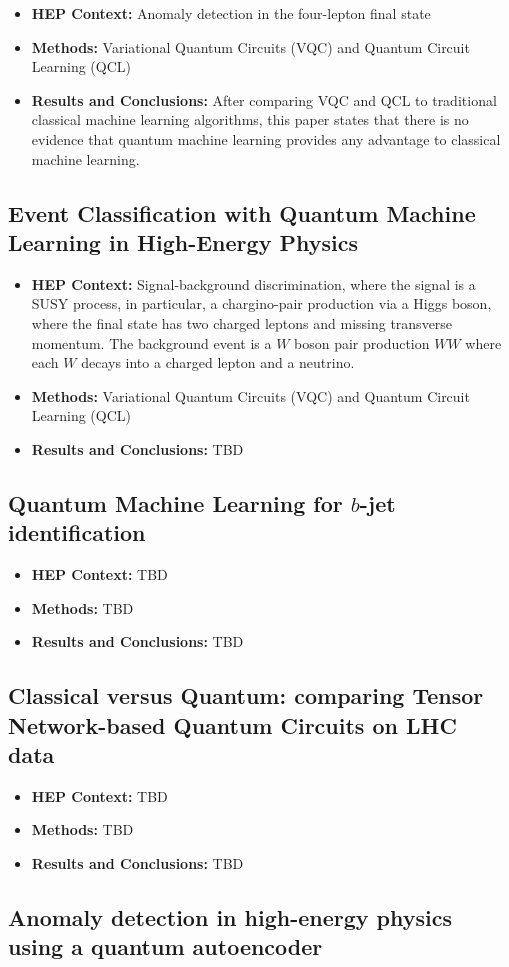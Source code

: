 \begin{itemize}
	\item \textbf{HEP Context: }Anomaly detection in the four-lepton final state
	\item \textbf{Methods: }Variational Quantum Circuits (VQC) and Quantum Circuit Learning (QCL)
	\item \textbf{Results and Conclusions: }After comparing VQC and QCL to traditional classical machine learning algorithms, this paper states that there is no evidence that quantum machine learning provides any advantage to classical machine learning.
\end{itemize}\subsection{Event Classification with Quantum Machine Learning in High-Energy Physics~\cite{Terashi:2020wfi}}
\begin{itemize}
	\item \textbf{HEP Context: }Signal-background discrimination, where the signal is a SUSY process, in particular, a chargino-pair production via a Higgs boson, where the final state has two charged leptons and missing transverse momentum. The background event is a $W$ boson pair production $WW$ where each $W$ decays into a charged lepton and a neutrino.
	\item \textbf{Methods: }Variational Quantum Circuits (VQC) and Quantum Circuit Learning (QCL)
	\item \textbf{Results and Conclusions: }TBD
\end{itemize}\subsection{Quantum Machine Learning for $b$-jet identification~\cite{Gianelle:2022unu}}
\begin{itemize}
	\item \textbf{HEP Context: }TBD
	\item \textbf{Methods: }TBD
	\item \textbf{Results and Conclusions: }TBD
\end{itemize}\subsection{Classical versus Quantum: comparing Tensor Network-based Quantum Circuits on LHC data~\cite{Araz:2022haf}}
\begin{itemize}
	\item \textbf{HEP Context: }TBD
	\item \textbf{Methods: }TBD
	\item \textbf{Results and Conclusions: }TBD
\end{itemize}\subsection{Anomaly detection in high-energy physics using a quantum autoencoder~\cite{Ngairangbam:2021yma}}
